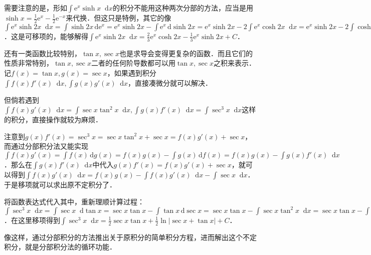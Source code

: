 \documentclass{ctexbook}
\newcommand*{\dif}{\mathop{}\!\mathrm{d}}
\begin{document}
需要注意的是，形如$\int\mathrm{e}^{x}\sinh{x}\dif{x}$的积分不能用这种两次分部的方法，应当是用$\sinh{x}=\frac{1}{2}\mathrm{e}^{x}-\frac{1}{2}\mathrm{e}^{-x}$来代换．但这只是特例，其它的像$\int\mathrm{e}^{x}\sinh{2x}\dif{x}=\int\sinh{2x}\,\mathrm{d}\mathrm{e}^{x}=\mathrm{e}^{x}\sinh{2x}-\int\mathrm{e}^{x}\,\mathrm{d}\sinh{2x}=\mathrm{e}^{x}\sinh{2x}-2\int\mathrm{e}^{x}\cosh{2x}\dif{x}=\mathrm{e}^{x}\sinh{2x}-2\int\cosh{2x}\,\mathrm{de}^{x}=\mathrm{e}^{x}\sinh{2x}-2\mathrm{e}^{x}\cosh{2x}+4\int\mathrm{e}^{x}\sinh{2x}\dif{x}$．这是可移项的，能够解得$\int\mathrm{e}^{x}\sinh{2x}\dif{x}=\frac{2}{3}\mathrm{e}^{x}\cosh{2x}-\frac{1}{3}\mathrm{e}^{x}\sinh{2x}+C$．\par
还有一类函数比较特别，$\tan{x},\sec{x}$也是求导会变得更复杂的函数．而且它们的性质非常特别，$\tan{x},\sec{x}$二者的任何阶导数都可以用$\tan{x},\sec{x}$之积来表示．记$f\left(x\right)=\tan{x},g\left(x\right)=\sec{x}$，如果遇到积分$\int f\left(x\right)f'\left(x\right)\dif{x},\int g\left(x\right)g'\left(x\right)\dif{x}$，直接凑微分就可以解决．\par
但倘若遇到$\int f\left(x\right)g'\left(x\right)\dif{x}=\int\sec{x}\tan^{2}{x}\dif{x},\int g\left(x\right)f'\left(x\right)\dif{x}=\int\sec^{3}{x}\dif{x}$这样的积分，直接操作就较为麻烦．\par
注意到$g\left(x\right)f'\left(x\right)=\sec^{3}{x}=\sec{x}\tan^{2}{x}+\sec{x}=f\left(x\right)g'\left(x\right)+\sec{x}$，而通过分部积分法又能实现$\int f\left(x\right)g'\left(x\right)=\int f\left(x\right)\,\mathrm{d}g\left(x\right)=f\left(x\right)g\left(x\right)-\int g\left(x\right)\,\mathrm{d}f\left(x\right)=f\left(x\right)g\left(x\right)-\int g\left(x\right)f'\left(x\right)\dif{x}$．那么在$\int g\left(x\right)f'\left(x\right)\dif{x}$中代入$g\left(x\right)f'\left(x\right)=f\left(x\right)g'\left(x\right)+\sec{x}$，就可以得到$\int f\left(x\right)g'\left(x\right)\dif{x}=f\left(x\right)g\left(x\right)-\int f\left(x\right)g'\left(x\right)\dif{x}-\int\sec{x}\dif{x}$．于是移项就可以求出原不定积分了．\par
将函数表达式代入其中，重新理顺计算过程：$\int\sec^{3}{x}\dif{x}=\int\sec{x}\dif{\tan{x}}=\sec{x}\tan{x}-\int\tan{x}\,\mathrm{d}\sec{x}=\sec{x}\tan{x}-\int\sec{x}\tan^{2}{x}\dif{x}=\sec{x}\tan{x}-\int\sec^{3}{x}\dif{x}+\int\sec{x}\dif{x}$．在这里移项得到$\int\sec^{3}{x}\dif{x}=\frac{1}{2}\sec{x}\tan{x}+\frac{1}{2}\ln{|\sec{x}+\tan{x}|}+C$．\par
像这样，通过分部积分的方法推出关于原积分的简单积分方程，进而解出这个不定积分，就是分部积分法的循环功能．\par
\end{document}
